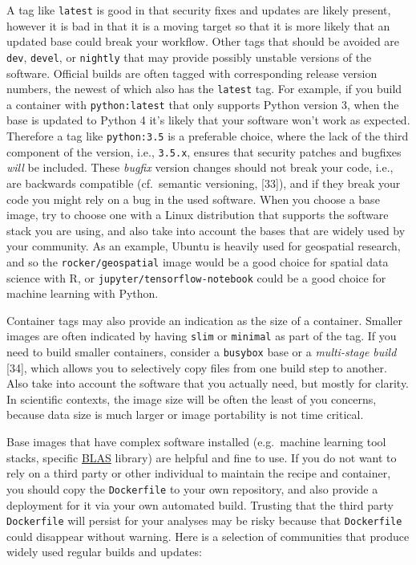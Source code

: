 \documentclass[10pt,letterpaper]{article}
\begin{document}
A tag like \texttt{latest} is good in that security fixes and updates
are likely present, however it is bad in that it is a moving target so
that it is more likely that an updated base could break your workflow.
Other tags that should be avoided are \texttt{dev}, \texttt{devel}, or
\texttt{nightly} that may provide possibly unstable versions of the
software. Official builds are often tagged with corresponding release
version numbers, the newest of which also has the \texttt{latest} tag.
For example, if you build a container with \texttt{python:latest} that
only supports Python version 3, when the base is updated to Python 4
it's likely that your software won't work as expected. Therefore a tag
like \texttt{python:3.5} is a preferable choice, where the lack of the
third component of the version, i.e., \texttt{3.5.x}, ensures that
security patches and bugfixes \emph{will} be included. These
\emph{bugfix} version changes should not break your code, i.e., are
backwards compatible (cf.~semantic versioning, {[}33{]}), and if they
break your code you might rely on a bug in the used software. When you
choose a base image, try to choose one with a Linux distribution that
supports the software stack you are using, and also take into account
the bases that are widely used by your community. As an example, Ubuntu
is heavily used for geospatial research, and so the
\texttt{rocker/geospatial} image would be a good choice for spatial data
science with R, or \texttt{jupyter/tensorflow-notebook} could be a good
choice for machine learning with Python.

Container tags may also provide an indication as the size of a
container. Smaller images are often indicated by having \texttt{slim} or
\texttt{minimal} as part of the tag. If you need to build smaller
containers, consider a \texttt{busybox} base or a \emph{multi-stage
build} {[}34{]}, which allows you to selectively copy files from one
build step to another. Also take into account the software that you
actually need, but mostly for clarity. In scientific contexts, the image
size will be often the least of you concerns, because data size is much
larger or image portability is not time critical.

Base images that have complex software installed (e.g.~machine learning
tool stacks, specific
\href{https://en.wikipedia.org/wiki/Basic_Linear_Algebra_Subprograms}{BLAS}
library) are helpful and fine to use. If you do not want to rely on a
third party or other individual to maintain the recipe and container,
you should copy the \texttt{Dockerfile} to your own repository, and also
provide a deployment for it via your own automated build. Trusting that
the third party \texttt{Dockerfile} will persist for your analyses may
be risky because that \texttt{Dockerfile} could disappear without
warning. Here is a selection of communities that produce widely used
regular builds and updates:
\end{document}
